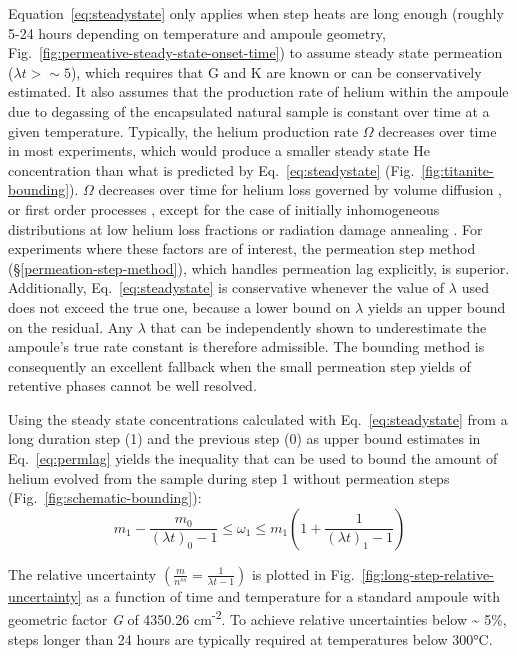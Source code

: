 Equation~\eqref{eq:steadystate} only applies when step heats are long enough (roughly 5-24 hours depending on temperature and ampoule geometry, Fig.~\ref{fig:permeative-steady-state-onset-time}) to assume steady state permeation (\(\lambda t > \sim 5\)), which requires that G and K are known or can be conservatively estimated. It also assumes that the production rate of helium within the ampoule due to degassing of the encapsulated natural sample is constant over time at a given temperature. Typically, the helium production rate \(\Omega\) decreases over time in most experiments, which would produce a smaller steady state He concentration than what is predicted by Eq.~\eqref{eq:steadystate} (Fig.~\ref{fig:titanite-bounding}). \(\Omega\) decreases over time for helium loss governed by volume diffusion \citep{wolf1996,reinersfarley1999,farleymckeon2015,farley2018,farley2024}, or first order processes \citep{yakubovich2010,wilson1973}, except for the case of initially inhomogeneous distributions at low helium loss fractions \citep{goldsmith2020,ketcham2011,shuster2004,farley1996} or radiation damage annealing \citep{cherniak2019,guenthner2013,flowers2007,flowers2009,shuster2006}. For experiments where these factors are of interest, the permeation step method (\S\ref{permeation-step-method}), which handles permeation lag explicitly, is superior. Additionally, Eq.~\eqref{eq:steadystate} is conservative whenever the value of \(\lambda\) used does not exceed the true one, because a lower bound on \(\lambda\) yields an upper bound on the residual. Any \(\lambda\) that can be independently shown to underestimate the ampoule's true rate constant is therefore admissible. The bounding method is consequently an excellent fallback when the small permeation step yields of retentive phases cannot be well resolved.

Using the steady state concentrations calculated with Eq.~\eqref{eq:steadystate} from a long duration step (1) and the previous step (0) as upper bound estimates in Eq.~\eqref{eq:permlag} yields the inequality that can be used to bound the amount of helium evolved from the sample during step 1 without permeation steps (Fig.~\ref{fig:schematic-bounding}):\emph{\hfill\break
}\begin{equation}
\label{eq:bound}
m_{1} - \frac{m_{0}}{(\lambda t)_{0} - 1} \leq \omega_{1} \leq m_{1}\left( 1 + \frac{1}{(\lambda t)_{1} - 1} \right)
\end{equation}

The relative uncertainty \(\left( \frac{m}{n^{ss}} = \frac{1}{\lambda t - 1} \right)\) is plotted in Fig.~\ref{fig:long-step-relative-uncertainty} as a function of time and temperature for a standard ampoule with geometric factor \emph{G} of 4350.26 cm\textsuperscript{-2}. To achieve relative uncertainties below \textasciitilde{} 5\%, steps longer than 24 hours are typically required at temperatures below 300°C.

